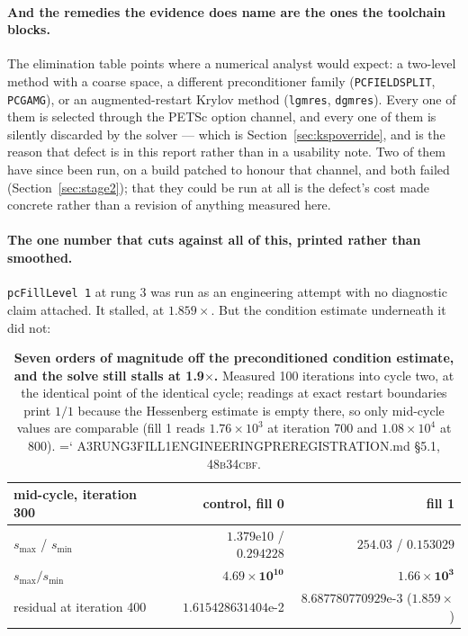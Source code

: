 \documentclass[11pt,a4paper]{article}
\newcommand{\artifact}[1]{{\small\ttfamily\hyphenchar\font=`\-\relax
  \def\_{\textunderscore\allowbreak}#1}}
\newcommand{\commit}[1]{\textsc{\small #1}}
\begin{document}
\paragraph{And the remedies the evidence does name are the ones the toolchain blocks.} The
elimination table points where a numerical analyst would expect: a two-level method with a
coarse space, a different preconditioner family (\texttt{PCFIELDSPLIT}, \texttt{PCGAMG}), or an
augmented-restart Krylov method (\texttt{lgmres}, \texttt{dgmres}). Every one of them is
selected through the PETSc option channel, and every one of them is silently discarded by the
solver --- which is Section~\ref{sec:kspoverride}, and is the reason that defect is in this
report rather than in a usability note. Two of them have since been run, on a build patched to
honour that channel, and both failed (Section~\ref{sec:stage2}); that they could be run at all
is the defect's cost made concrete rather than a revision of anything measured here.

\paragraph{The one number that cuts against all of this, printed rather than smoothed.}
\texttt{pcFillLevel 1} at rung 3 was run as an engineering attempt with no diagnostic claim
attached. It stalled, at \(1.859\times\). But the condition estimate underneath it did not:

\begin{table}[htbp]
\centering\footnotesize
\begin{tabular}{@{}lrr@{}}
\toprule
mid-cycle, iteration 300 & control, fill 0 & fill 1 \\
\midrule
\(s_{\max}\) / \(s_{\min}\) & \(1.379\)e10 / \(0.294228\) & \(254.03\) / \(0.153029\) \\
\(s_{\max}/s_{\min}\) & \(\mathbf{4.69\times10^{10}}\) & \(\mathbf{1.66\times10^{3}}\) \\
residual at iteration 400 & \(1.615428631404\)e-2 & \(8.687780770929\)e-3 (\(1.859\times\)) \\
\bottomrule
\end{tabular}
\caption{\textbf{Seven orders of magnitude off the preconditioned condition estimate, and the
solve still stalls at 1.9\(\times\).} Measured 100 iterations into cycle two, at the identical
point of the identical cycle;
readings at exact restart boundaries print \(1/1\) because the Hessenberg estimate is empty
there, so only mid-cycle values are comparable (fill 1 reads \(1.76\times10^{3}\) at iteration
700 and \(1.08\times10^{4}\) at 800). \artifact{A3\_RUNG3\_FILL1\_\allowbreak ENGINEERING\_PREREGISTRATION.md} \S5.1,
\commit{48b34cbf}.}
\label{tab:kappa}
\end{table}
\end{document}
